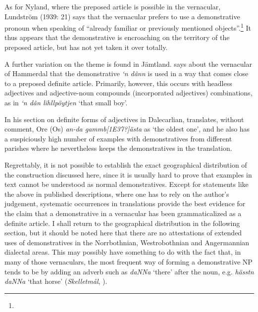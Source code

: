 \begin{styleBodytextC}
As for Nyland, where the preposed article is possible in the vernacular, Lundström (1939: 21) says that the vernacular prefers to use a demonstrative pronoun when speaking of “already familiar or previously mentioned objects”.\footnote{} It thus appears that the demonstrative is encroaching on the territory of the preposed article, but has not yet taken it over totally. 

\end{styleBodytextC}

\begin{styleBodytextC}
A further variation on the theme is found in Jämtland. \citet[38]{Reinhammar2005} says about the vernacular of Hammerdal that the demonstrative \textit{‘n dânn }is used in a way that comes close to a preposed definite article. Primarily, however, this occurs with headless adjectives and adjective-noun compounds (incorporated adjectives) combinations, as in \textit{‘n dân li{\textasciigrave}hllpöytjen }‘that small boy’. 

\end{styleBodytextC}

\begin{styleBodytextC}
In his section on definite forms of adjectives in Dalecarlian, \citet[147]{Levander1928} translates, without comment, Ore (Os) \textit{an-da gammb[1E37?]ästa} as ‘the oldest one’, and he also has a suspiciously high number of examples with demonstratives from different parishes where he nevertheless keeps the demonstratives in the translation. 

\end{styleBodytextC}

\begin{styleBodytextC}
Regrettably, it is not possible to establish the exact geographical distribution of the construction discussed here, since it is usually hard to prove that examples in text cannot be understood as normal demonstratives. Except for statements like the above in published descriptions, where one has to rely on the author’s judgement, systematic occurrences in translations provide the best evidence for the claim that a demonstrative in a vernacular has been grammaticalized as a definite article. I shall return to the geographical distribution in the following section, but it should be noted here that there are no attestations of extended uses of demonstratives in the Norrbothnian, Westrobothnian and Angermannian dialectal areas. This may possibly have something to do with the fact that, in many of those vernaculars, the most frequent way of forming a demonstrative NP tends to be by adding an adverb such as \textit{daNNa} ‘there’ after the noun, e.g. \textit{hässtn daNNa} ‘that horse’ (\textit{Skelletmål}, \citet[41]{Marklund1976}).

\end{styleBodytextC}

